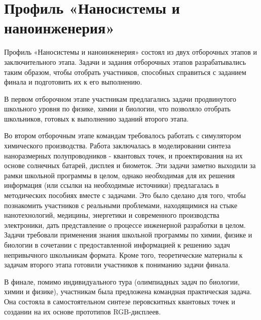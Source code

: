 

\chapter{Профиль «Наносистемы и наноинженерия»}

Профиль «Наносистемы и наноинженерия» состоял из двух отборочных этапов и заключительного этапа. Задачи и задания отборочных этапов разрабатывались таким образом, чтобы отобрать участников, способных справиться с заданием финала и подготовить их к его выполнению. 

В первом отборочном этапе участникам предлагались задачи продвинутого школьного уровня по физике, химии и биологии, что позволяло отобрать школьников, готовых к выполнению заданий второго этапа. 

Во втором отборочным этапе командам требовалось работать с симулятором химического производства. Работа заключалась в моделировании синтеза наноразмерных полупроводников - квантовых точек, и проектирования на их основе солнечных батарей, дисплея и биометок. Эти задачи заметно выходили за рамки школьной программы в целом, однако необходимая для их решения информация (или ссылки на необходимые источники) предлагалась в методических пособиях вместе с задачами. Это было сделано для того, чтобы познакомить участников с реальными проблемами, находящимися на стыке нанотехнологий, медицины, энергетики и современного производства электроники, дать представление о процессе инженерной разработки в целом. Задачи требовали применения знания школьной программы по химии, физике и биологии в сочетании с предоставленной информацией к решению задач непривычного школьникам формата. Кроме того, теоретические материалы к задачам второго этапа готовили участников к пониманию задачи финала. 

В финале, помимо индивидуального тура (олимпиадных задач по биологии, химии и физике), участникам была предложена командная практическая задача. Она состояла в самостоятельном синтезе перовскитных квантовых точек и создании на их основе прототипов RGB-дисплеев. 

